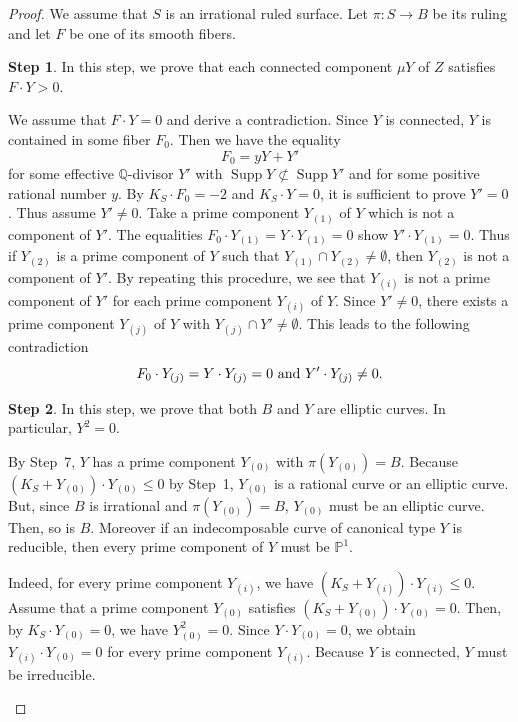 \documentclass[12pt,twoside]{amsart}
\newcommand{\Supp}[0]{{\operatorname{Supp}}}
\theoremstyle{definition}
\newtheorem{step}{Step}
\newcommand{\Q}{$\mathbb{Q}$}
\begin{document}
\begin{proof}
We assume that $S$ is an irrational ruled surface. 
Let $\pi :S\to B$ be its ruling and 
let $F$ be one of its smooth fibers. 


\begin{step}
In this step, we prove that 
each connected component $\mu Y$ of $Z$ satisfies $F\cdot Y>0$. 

We assume that $F\cdot Y=0$ and derive a contradiction. 
Since $Y$ is connected, $Y$ is contained in some fiber $F_0$. 
Then we have the equality 
$$F_0=yY+Y'$$
for some effective \Q-divisor $Y'$ with $\Supp Y \not\subset \Supp Y'$ and 
for some positive rational number $y$. 
By $K_S\cdot F_0=-2$ and $K_S\cdot Y=0$, 
it is sufficient to prove $Y'=0$. 
Thus assume $Y'\neq 0.$ 
Take a prime component $Y_{(1)}$ of $Y$ which is not a component of $Y'$. 
The equalities $F_0\cdot Y_{(1)}=Y\cdot Y_{(1)}=0$ show $Y'\cdot Y_{(1)}=0.$ 
Thus if $Y_{(2)}$ is a prime component of $Y$ such that 
$Y_{(1)} \cap Y_{(2)} \neq \emptyset$, then 
$Y_{(2)}$ is not a component of $Y'$. 
By repeating this procedure, we see that 
$Y_{(i)}$ is not a prime component of $Y'$ 
for each prime component $Y_{(i)}$ of $Y$. 
Since $Y'\neq 0$, there exists a prime component $Y_{(j)}$ of $Y$ 
with $Y_{(j)} \cap Y' \neq \emptyset$. 
This leads to the following contradiction
$$F_0\cdot Y_{(j)}=Y\cdot Y_{(j)}=0\,\,{\rm and}\,\,Y'\cdot Y_{(j)}\neq 0.$$
\end{step}

\begin{step}
In this step, we prove that both $B$ and $Y$ are elliptic curves. 
In particular, $Y^2=0$. 

By Step~7, $Y$ has a prime component $Y_{(0)}$ with $\pi(Y_{(0)})=B$. 
Because $(K_S+Y_{(0)})\cdot Y_{(0)} \leq 0$ by Step~1, 
$Y_{(0)}$ is a rational curve or an elliptic curve. 
But, since $B$ is irrational and $\pi(Y_{(0)})=B$, 
$Y_{(0)}$ must be an elliptic curve. 
Then, so is $B$. 
Moreover if an indecomposable curve 
of canonical type $Y$ is reducible, 
then every prime component of $Y$ must be $\mathbb{P}^1$. 

Indeed, for every prime component $Y_{(i)}$, 
we have $(K_S+Y_{(i)})\cdot Y_{(i)}\leq 0$. 
Assume that a prime component $Y_{(0)}$ satisfies 
$(K_S+Y_{(0)})\cdot Y_{(0)}=0$. 
Then, by $K_S\cdot Y_{(0)}=0$, 
we have $Y_{(0)}^2=0$. 
Since $Y\cdot Y_{(0)}=0$, we obtain $Y_{(i)}\cdot Y_{(0)}=0$ 
for every prime component $Y_{(i)}$. 
Because $Y$ is connected, $Y$ must be irreducible. 
\end{step}



\end{proof}
\end{document}
